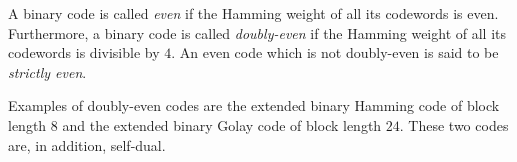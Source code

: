 \documentclass[12pt]{article}
\begin{document}
A binary code is called \emph{even} if the Hamming weight of all its
codewords is even. Furthermore, a binary code is called
\emph{doubly-even} if the Hamming weight of all its codewords is
divisible by $4$. An even code which is not doubly-even is said to be
\emph{strictly even}.

Examples of doubly-even codes are the extended binary Hamming code of
block length $8$ and the extended binary Golay code of block length
$24$. These two codes are, in addition, self-dual.
\end{document}
